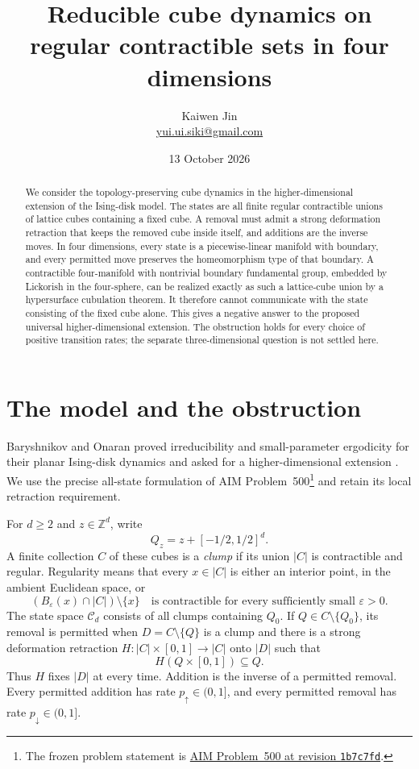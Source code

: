 \documentclass[11pt]{article}
\title{Reducible cube dynamics on regular contractible sets in four dimensions}
\author{Kaiwen Jin\\\small\href{mailto:yui.ui.siki@gmail.com}{yui.ui.siki@gmail.com}}
\date{13 October 2026}
\theoremstyle{remark}
\newcommand{\Cl}{\mathcal C}
\newcommand{\Z}{\mathbb Z}
\begin{document}
\maketitle
\begin{abstract}
We consider the topology-preserving cube dynamics in the higher-dimensional
extension of the Ising-disk model. The states are all finite regular
contractible unions of lattice cubes containing a fixed cube. A removal must
admit a strong deformation retraction that keeps the removed cube inside
itself, and additions are the inverse moves. In four dimensions, every state
is a piecewise-linear manifold with boundary, and every permitted move
preserves the homeomorphism type of that boundary. A contractible
four-manifold with nontrivial boundary fundamental group, embedded by
Lickorish in the four-sphere, can be realized exactly as such a lattice-cube
union by a hypersurface cubulation theorem. It therefore cannot communicate
with the state consisting of the fixed cube alone. This gives a negative
answer to the proposed universal higher-dimensional extension. The obstruction holds
for every choice of positive transition rates; the separate three-dimensional
question is not settled here.
\end{abstract}

\section{The model and the obstruction}

Baryshnikov and Onaran proved irreducibility and small-parameter ergodicity
for their planar Ising-disk dynamics and asked for a higher-dimensional
extension \cite[Theorem~6.5 and Conjecture~6.9]{BO}. We use the precise
all-state formulation of AIM Problem~500\footnote{The frozen problem statement
is \href{https://github.com/MColbrook/AIM/blob/1b7c7fd251c1643bb41f0e3cef38704bcef410fd/problems/500-higher-dimensional-ising-clumps.md}{AIM Problem~500 at revision \texttt{1b7c7fd}}.}
and retain its local retraction requirement.

For $d\geq2$ and $z\in\Z^d$, write
\[
 Q_z=z+[-1/2,1/2]^d.
\]
A finite collection $C$ of these cubes is a \emph{clump} if its union
$|C|$ is contractible and regular. Regularity means that every
$x\in|C|$ is either an interior point, in the ambient Euclidean space, or
\begin{equation}\label{eq:regular}
 (B_\varepsilon(x)\cap|C|)\setminus\{x\}
 \quad\text{is contractible for every sufficiently small }\varepsilon>0.
\end{equation}
The state space $\Cl_d$ consists of all clumps containing $Q_0$.
If $Q\in C\setminus\{Q_0\}$, its removal is permitted when
$D=C\setminus\{Q\}$ is a clump and there is a strong deformation
retraction $H:|C|\times[0,1]\longrightarrow|C|$ onto $|D|$ such that
\begin{equation}\label{eq:supported}
 H(Q\times[0,1])\subseteq Q.
\end{equation}
Thus $H$ fixes $|D|$ at every time. Addition is the inverse of a permitted
removal. Every permitted addition has rate $p_\uparrow\in(0,1]$, and every
permitted removal has rate $p_\downarrow\in(0,1]$.
\end{document}
